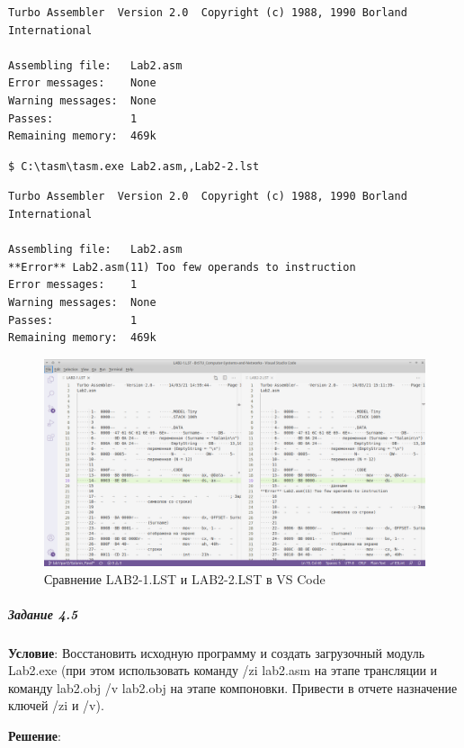 \begin{lstlisting}[language=Out]
Turbo Assembler  Version 2.0  Copyright (c) 1988, 1990 Borland International

Assembling file:   Lab2.asm
Error messages:    None
Warning messages:  None
Passes:            1
Remaining memory:  469k
\end{lstlisting}

\begin{lstlisting}[language=Terminal]
$ C:\tasm\tasm.exe Lab2.asm,,Lab2-2.lst
\end{lstlisting}

\begin{lstlisting}[language=Out]
Turbo Assembler  Version 2.0  Copyright (c) 1988, 1990 Borland International

Assembling file:   Lab2.asm
**Error** Lab2.asm(11) Too few operands to instruction
Error messages:    1
Warning messages:  None
Passes:            1
Remaining memory:  469k
\end{lstlisting}

\begin{figure}[h]
    \centering
    \includegraphics[width=18cm]{../_INCLUDES/lst1-and-lst2.png}
    \caption{Сравнение LAB2-1.LST и LAB2-2.LST в VS Code}
\end{figure}



\subparagraph{Задание 4.5}

\textbf{Условие}:
Восстановить исходную программу и создать загрузочный модуль Lab2.exe (при этом использовать команду  /zi lab2.asm на этапе трансляции и команду lab2.obj  /v lab2.obj на этапе компоновки. Привести в отчете назначение ключей /zi и /v).

\textbf{Решение}:



